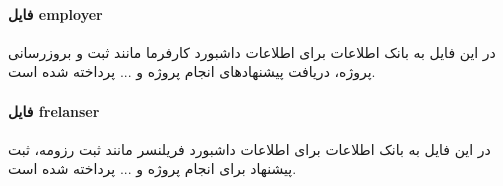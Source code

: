 \paragraph{فایل employer}
در این فایل به بانک اطلاعات برای اطلاعات داشبورد کارفرما مانند ثبت و بروزرسانی پروژه، دریافت پیشنهادهای انجام پروژه و ... پرداخته شده است.

\paragraph{فایل frelanser}
در این فایل به بانک اطلاعات برای ‌اطلاعات داشبورد فریلنسر مانند ثبت رزومه، ثبت پیشنهاد برای انجام پروژه و ... پرداخته شده است.
